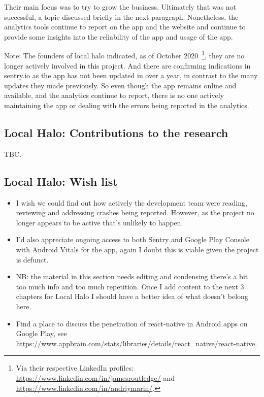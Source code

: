 Their main focus was to try to grow the business. Ultimately that was not successful, a topic discussed briefly in the next paragraph. Nonetheless, the analytics tools continue to report on the app and the website and continue to provide some insights into the reliability of the app and usage of the app.

Note: The founders of local halo indicated, as of October 2020~\footnote{Via their respective LinkedIn profiles: \url{https://www.linkedin.com/in/jamesroutledge/} and \url{https://www.linkedin.com/in/andriymarin/}.}, they are no longer actively involved in this project. And there are confirming indications in sentry.io as the app has not been updated in over a year, in contrast to the many updates they made previously. So even though the app remains online and available, and the analytics continue to report, there is no one actively maintaining the app or dealing with the errors being reported in the analytics.

\subsection{Local Halo: Contributions to the research}
TBC.

\subsection*{Local Halo: Wish list}
{\small
\begin{itemize}
    \itemsep0em
    \item I wish we could find out how actively the development team were reading, reviewing and addressing crashes being reported. However, as the project no longer appears to be active that's unlikely to happen.
    \item I'd also appreciate ongoing access to both Sentry and Google Play Console with Android Vitals for the app, again I doubt this is viable given the project is defunct.
    \item NB: the material in this section needs editing and condensing there's a bit too much info and too much repetition. Once I add content to the next 3 chapters for Local Halo I should have a better idea of what doesn't belong here.
    \item Find a place to discuss the penetration of react-native in Android apps on Google Play, see \url{https://www.appbrain.com/stats/libraries/details/react_native/react-native}.
\end{itemize}
}

